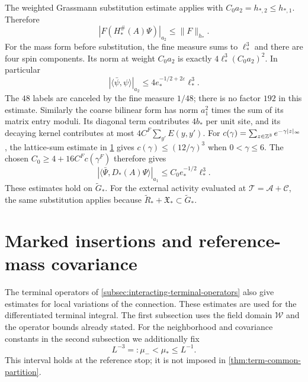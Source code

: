 The weighted Grassmann substitution estimate
applies with $C_0a_2=h_{*,2}\le h_{*,1}$.
Therefore
\begin{equation}\label{eq:interacting-terminal-substitution}
 |F(H_*^\#(A)\Psi)|_{a_2}\le\|F\|_{h_*}.
\end{equation}
For the mass form before substitution, the
fine measure sums to $\ell_*^3$ and there
are four spin components. Its norm at
weight $C_0a_2$ is exactly
$4\ell_*^3(C_0a_2)^2$. In particular
\begin{equation}\label{eq:interacting-terminal-mass-form}
 |\langle\bar\psi,\psi\rangle|_{a_2}
                   \le4e_*^{-1/2+2\varepsilon}\ell_*^3.
\end{equation}
The $48$ labels are canceled by the fine
measure $1/48$; there is no factor $192$
in this estimate. Similarly the coarse
bilinear form has norm $a_1^2$ times the
sum of its matrix entry moduli. Its diagonal
term contributes $4b_*$ per unit site,
and its decaying kernel contributes at
most $4C^F\sum_{y'}E(y,y')$.
For $c(\gamma)=\sum_{z\in\mathbb Z^3}e^{-\gamma|z|_\infty}$,
the lattice-sum estimate in \cref{sec:tpm-marked} gives
$c(\gamma)\le(12/\gamma)^3$ when $0<\gamma\le6$.
The chosen $C_0\ge4+16C^Fc(\gamma^F)$ therefore gives
\begin{equation}\label{eq:interacting-terminal-Dirac-form}
 |\langle\bar\Psi,D_*(A)\Psi\rangle|_{a_1}
                                  \le C_0e_*^{-1/2}\ell_*^3.
\end{equation}
These estimates hold on $\widetilde G_*$.
For the external activity evaluated at
$\mathscr T=\mathscr A+\mathscr C$, the
same substitution applies because
$\widetilde R_*+\mathfrak X_*\subset\widetilde G_*$.


\appendix
\section{Marked insertions and reference-mass covariance}
\label{sec:tpm-marked}

The terminal operators of \cref{subsec:interacting-terminal-operators}
also give estimates for local variations of the connection.
These estimates are used for the differentiated terminal integral.
The first subsection uses the field domain $\mathcal W$ and
the operator bounds already stated. For the neighborhood and
covariance constants in the second subsection we additionally fix
\[
                    L^{-3}=:\mu_-<\mu_*\le L^{-1}.
\]
This interval holds at the reference stop; it is not imposed
in \cref{thm:term-common-partition}.

